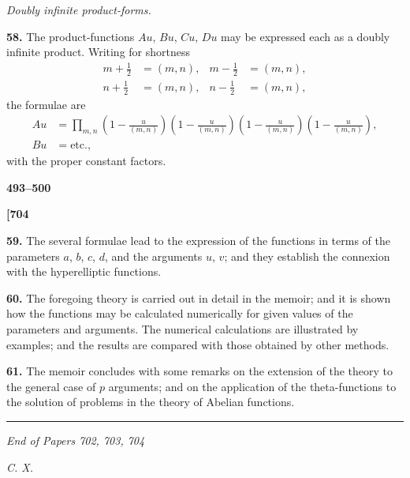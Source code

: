 \documentclass[12pt,a4paper]{article}
\theoremstyle{definition}
\begin{document}
\vspace{1em}

\begin{center}
\textit{Doubly infinite product-forms.}
\end{center}

\vspace{0.5em}

\noindent\textbf{58.}\quad
The product-functions $Au$, $Bu$, $Cu$, $Du$ may be expressed each as a doubly infinite product. Writing for shortness
\begin{align*}
m + \tfrac{1}{2} &= (m, n), & m - \tfrac{1}{2} &= (m, n), \\
n + \tfrac{1}{2} &= (m, n), & n - \tfrac{1}{2} &= (m, n),
\end{align*}
the formulae are
\begin{align*}
Au &= \prod_{m,n} \left(1 - \frac{u}{(m,n)}\right)\left(1 - \frac{u}{(m,n)}\right)\left(1 - \frac{u}{(m,n)}\right)\left(1 - \frac{u}{(m,n)}\right), \\
Bu &= \text{etc.},
\end{align*}
with the proper constant factors.

\vspace{1em}

\begin{center}
\textbf{493--500}
\end{center}

\vspace{0.5em}

\noindent\textbf{[704}

\vspace{0.5em}

\noindent\textbf{59.}\quad
The several formulae lead to the expression of the functions in terms of the parameters $a$, $b$, $c$, $d$, and the arguments $u$, $v$; and they establish the connexion with the hyperelliptic functions.

\noindent\textbf{60.}\quad
The foregoing theory is carried out in detail in the memoir; and it is shown how the functions may be calculated numerically for given values of the parameters and arguments. The numerical calculations are illustrated by examples; and the results are compared with those obtained by other methods.

\noindent\textbf{61.}\quad
The memoir concludes with some remarks on the extension of the theory to the general case of $p$ arguments; and on the application of the theta-functions to the solution of problems in the theory of Abelian functions.

\vspace{1em}

\begin{center}
\rule{0.5\textwidth}{0.4pt}
\end{center}

\vspace{1em}

\begin{center}
\textit{End of Papers 702, 703, 704}
\end{center}

\vspace{1em}

\begin{flushright}
\textit{C. X.}
\end{flushright}
\end{document}
